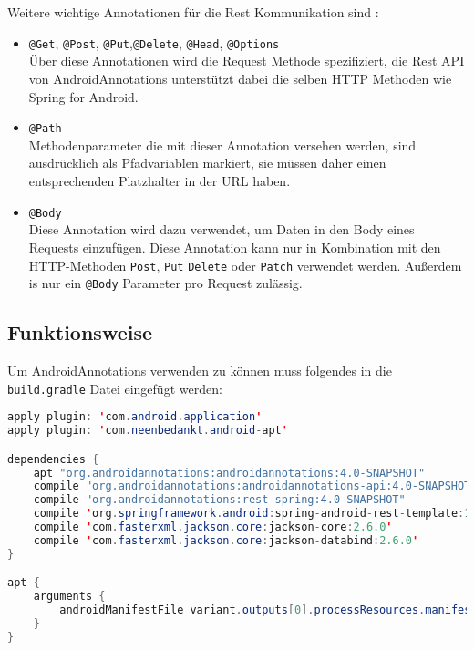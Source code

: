 \\\\
Weitere wichtige Annotationen für die Rest Kommunikation sind \cite{annotation:rest}:
 
\begin{itemize}
	\item \texttt{@Get}, \texttt{@Post}, \texttt{@Put},\texttt{@Delete}, \texttt{@Head}, \texttt{@Options}\\
	Über diese Annotationen wird die Request Methode spezifiziert, die Rest API von AndroidAnnotations unterstützt dabei die selben HTTP Methoden wie Spring for Android.
	\item \texttt{@Path}\\
	Methodenparameter die mit dieser Annotation versehen werden, sind ausdrücklich als Pfadvariablen markiert, sie müssen daher einen entsprechenden Platzhalter in der URL haben.
	\item \texttt{@Body}\\
	Diese Annotation wird dazu verwendet, um Daten in den Body eines Requests einzufügen. Diese Annotation kann nur in Kombination mit den HTTP-Methoden \texttt{Post}, \texttt{Put} \texttt{Delete} oder \texttt{Patch} verwendet werden. Außerdem is nur ein \texttt{@Body} Parameter pro Request zulässig.
\end{itemize}

\subsection{Funktionsweise}

Um AndroidAnnotations verwenden zu können muss folgendes in die \texttt{build.gradle} Datei eingefügt werden:

\begin{lstlisting}[language=java,label=dependenciesAA,stringstyle=\color{mymauve}\scriptsize, numbers=none, frame=single]
apply plugin: 'com.android.application'
apply plugin: 'com.neenbedankt.android-apt'

dependencies {
	apt "org.androidannotations:androidannotations:4.0-SNAPSHOT"
	compile "org.androidannotations:androidannotations-api:4.0-SNAPSHOT"
	compile "org.androidannotations:rest-spring:4.0-SNAPSHOT"
	compile 'org.springframework.android:spring-android-rest-template:1.0.1.RELEASE'
	compile 'com.fasterxml.jackson.core:jackson-core:2.6.0'
	compile 'com.fasterxml.jackson.core:jackson-databind:2.6.0'
}

apt {
	arguments {
		androidManifestFile variant.outputs[0].processResources.manifestFile
	}
}
\end{lstlisting}

